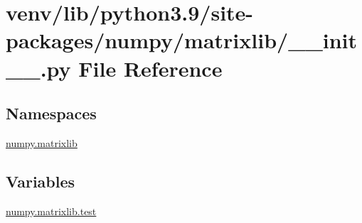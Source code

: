 \hypertarget{venv_2lib_2python3_89_2site-packages_2numpy_2matrixlib_2____init_____8py}{}\section{venv/lib/python3.9/site-\/packages/numpy/matrixlib/\+\_\+\+\_\+init\+\_\+\+\_\+.py File Reference}
\label{venv_2lib_2python3_89_2site-packages_2numpy_2matrixlib_2____init_____8py}
\subsection*{Namespaces}
\begin{DoxyCompactItemize}
\item 
 \hyperlink{namespacenumpy_1_1matrixlib}{numpy.\+matrixlib}
\end{DoxyCompactItemize}
\subsection*{Variables}
\begin{DoxyCompactItemize}
\item 
\hyperlink{namespacenumpy_1_1matrixlib_aee00242cbaae677f8e851d22c54610d6}{numpy.\+matrixlib.\+test}
\end{DoxyCompactItemize}
